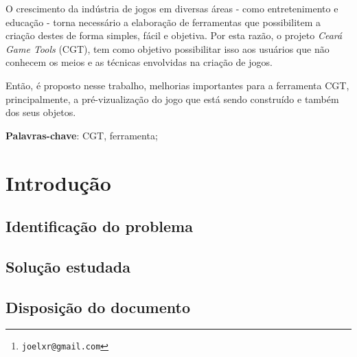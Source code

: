 \documentclass[12pt,twoside,openright,a4paper,english,brazil,sumario=tradicional]{abntex2}
\author{Joel Xavier Rocha\thanks{\texttt{joelxr@gmail.com}}}
\begin{document}
\frenchspacing
\imprimircapa
\imprimirfolhaderosto*
%     
% 

\begin{agradecimentos}

\end{agradecimentos}

\setlength{\absparsep}{18pt}
\begin{resumo}
O crescimento da indústria de jogos em diversas áreas - como entretenimento e educação - torna necessário a elaboração de ferramentas que possibilitem a criação destes de forma simples, fácil e objetiva. Por esta razão, o projeto \emph{Ceará Game Tools} (CGT), tem como objetivo possibilitar isso aos usuários que não conhecem os meios e as técnicas envolvidas na criação de jogos.

Então, é proposto nesse trabalho, melhorias importantes para a ferramenta CGT, principalmente, a pré-vizualização do jogo que está sendo construído e também dos seus objetos.

\vspace{\onelineskip}
\noindent
\textbf{Palavras-chave}: CGT, ferramenta;
\end{resumo}

\listoffigures*
\cleardoublepage

\listoftables*
\cleardoublepage

\tableofcontents*
\cleardoublepage

\textual

\chapter{Introdução} %
\label{chap:introducao}
\section{Identificação do problema}
\section{Solução estudada}
\section{Disposição do documento}
\end{document}
